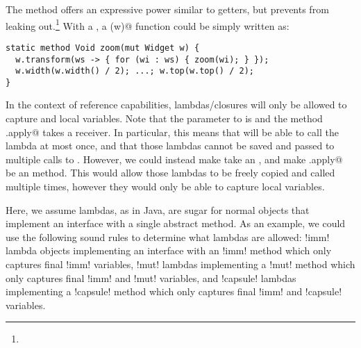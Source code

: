 The \Q@transform@ method offers an expressive power similar to \Q@mut@ getters, but prevents \Q@Widgets@ from leaking out.\footnote{}  With a \Q@Transformer@, a \Q@zoom(w)@ function could be simply written as:
\begin{lstlisting}
static method Void zoom(mut Widget w) {
  w.transform(ws -> { for (wi : ws) { zoom(wi); } });
  w.width(w.width() / 2); ...; w.top(w.top() / 2); 
}
\end{lstlisting}

In the context of reference capabilities, \Q@capsule@ lambdas/closures will only be allowed to capture \Q@imm@ and \Q@capsule@ local variables.
Note that the \Q@Transformer@ parameter to \Q@transform@ is \Q@capsule@ and the method \Q@Trasformer.apply@ takes a \Q@capsule@ receiver. In particular, this means that \Q@transform@ will be able to call the lambda at most once,
and that those lambdas cannot be saved and passed to multiple calls to \Q@transform@.
However, we could instead make \Q@transform@ take an \Q@imm@ \Q@Transformer@, and make \Q@Transformer.apply@ be an \Q@imm@ method. This would allow those lambdas to be freely copied and called multiple times, however they would only be able to capture \Q@imm@ local variables.

Here, we assume lambdas, as in Java, are sugar for normal objects that implement an interface with a single abstract method.
As an example, we could use the following sound rules to determine what lambdas are allowed:
\Q!imm! lambda objects implementing an interface with an \Q!imm! method which only captures final \Q!imm! variables,
\Q!mut! lambdas implementing a \Q!mut! method which only captures final \Q!imm! and \Q!mut! variables,
and \Q!capsule! lambdas implementing a \Q!capsule! method which only captures final \Q!imm! and \Q!capsule! variables.


